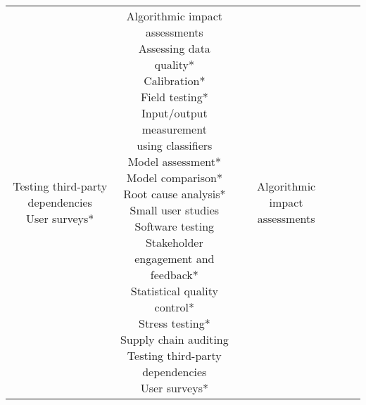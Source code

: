 \documentclass[fleqn]{article}
\begin{document}
\begin{landscape}
\begin{table}[H]
\begin{tabular}{|c|c|c|c|c|}
{			\textbullet\hspace{3pt} Testing third-party dependencies \\ 
			\textbullet\hspace{3pt} User surveys*\\ 
		}
		& \makecell[l]{
			\textbullet\hspace{3pt} Algorithmic impact assessments \\ 
			\textbullet\hspace{3pt} Assessing data quality*\\ 
			\textbullet\hspace{3pt} Calibration*\\ 
			\textbullet\hspace{3pt} Field testing*\\ 
			\textbullet\hspace{3pt} Input/output measurement\\\hspace{10pt}using classifiers \\ 
			\textbullet\hspace{3pt} Model assessment*\\ 
			\textbullet\hspace{3pt} Model comparison*\\ 
			\textbullet\hspace{3pt} Root cause analysis*\\ 
			\textbullet\hspace{3pt} Small user studies \\ 
			\textbullet\hspace{3pt} Software testing \\ 
			\textbullet\hspace{3pt} Stakeholder engagement and feedback*\\ 
			\textbullet\hspace{3pt} Statistical quality control*\\ 
			\textbullet\hspace{3pt} Stress testing*\\ 
			\textbullet\hspace{3pt} Supply chain auditing \\
			\textbullet\hspace{3pt} Testing third-party dependencies \\ 
			\textbullet\hspace{3pt} User surveys*\\ 
		}
		& \makecell[l]{
			\textbullet\hspace{3pt} Algorithmic impact assessments\\  	
}
\end{tabular}
\end{table}
\end{landscape}
\end{document}
